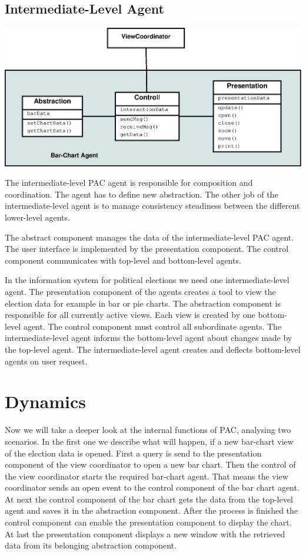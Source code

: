 \documentclass{scrbook}
\begin{document}
\subsection{Intermediate-Level Agent}

\begin{center}
\includegraphics[width=.8\textwidth]{./pics/Components.eps}\end{center}


The intermediate-level PAC agent is responsible for composition and coordination. The agent has to define new abstraction. The other job of the intermediate-level agent is to manage consistency steadiness between the different lower-level agents. 

The abstract component manages the data of the intermediate-level PAC agent. The user interface is implemented by the presentation component. The control component communicates with top-level and bottom-level agents. 

In the information system for political elections we need one intermediate-level agent. The presentation component of the agents creates a tool to view the election data for example in bar or pie charts.  The abstraction component is responsible for all currently active views. Each view is created by one bottom-level agent. The control component must control all subordinate agents. The intermediate-level agent informs the bottom-level agent about changes made by the top-level agent. The intermediate-level agent creates and deflects bottom-level agents on user request. 


\section{Dynamics}

Now we will take a deeper look at the internal functions of PAC, analysing two scenarios.  In the first one we describe what will happen, if a new bar-chart view of the election data is opened.
First a query is send to the presentation component of the view coordinator to open a new bar chart. Then the control of the view coordinator starts the required bar-chart agent. That means the view coordinator sends an open event to the control component of the bar chart agent. At next the control component of the bar chart gets the data from the top-level agent and saves it in the abstraction component. After the process is finished the control component can enable the presentation component to display the chart. At last the presentation component displays a new window with the retrieved data from its belonging abstraction component.
\end{document}
